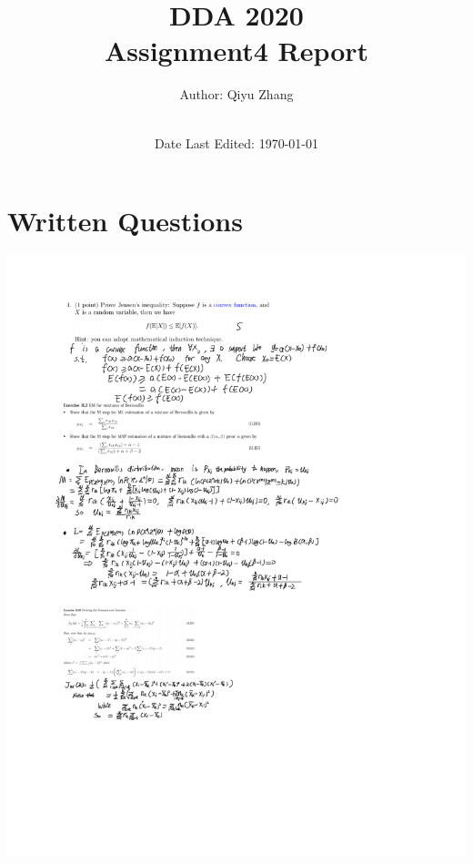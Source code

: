 \documentclass{article}[12]
\title{\Large DDA 2020  \\[0.5cm]
        \bf\Large Assignment4 Report}
\author{\large Author: Qiyu Zhang\\ \ \\}
\date{\large Date Last Edited: \today}
\begin{document}

\tableofcontents
\newpage
\section{Written Questions}
\includegraphics[scale=0.5]{1.png}
\newpage
\end{document}
